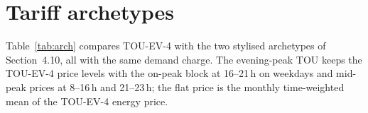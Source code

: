 \documentclass[11pt]{article}
\begin{document}


\section{Tariff archetypes}
Table~\ref{tab:arch} compares TOU-EV-4 with the two stylised archetypes of Section~4.10, all with the same demand charge. The evening-peak TOU keeps the TOU-EV-4 price levels with the on-peak block at 16--21\,h on weekdays and mid-peak prices at 8--16\,h and 21--23\,h; the flat price is the monthly time-weighted mean of the TOU-EV-4 energy price.





\end{document}
